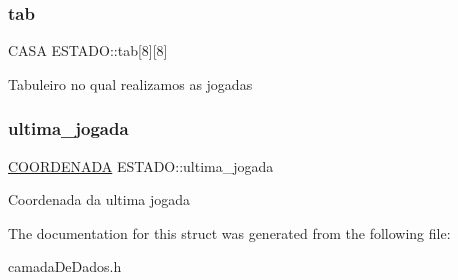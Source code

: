 \subsubsection{\texorpdfstring{tab}{tab}}
{\footnotesize\ttfamily C\+A\+SA E\+S\+T\+A\+D\+O\+::tab\mbox{[}8\mbox{]}\mbox{[}8\mbox{]}}

Tabuleiro no qual realizamos as jogadas \mbox{\label{structESTADO_a4896a5c5c1f40b43fb795623327e3f47}} 
\subsubsection{\texorpdfstring{ultima\+\_\+jogada}{ultima\_jogada}}
{\footnotesize\ttfamily \hyperlink{structCOORDENADA}{C\+O\+O\+R\+D\+E\+N\+A\+DA} E\+S\+T\+A\+D\+O\+::ultima\+\_\+jogada}

Coordenada da ultima jogada 

The documentation for this struct was generated from the following file\+:\begin{DoxyCompactItemize}
\item 
camada\+De\+Dados.\+h\end{DoxyCompactItemize}
